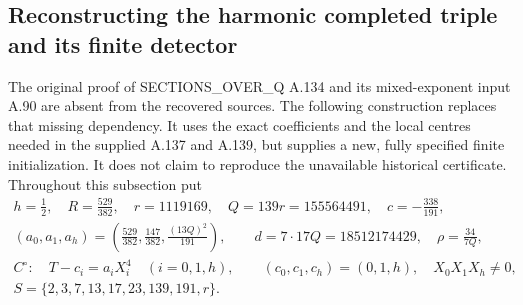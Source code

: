 \subsection{Reconstructing the harmonic completed triple and its finite detector}

The original proof of SECTIONS\_OVER\_Q A.134 and its mixed-exponent
input A.90 are absent from the recovered sources.  The following
construction replaces that missing dependency.  It uses the exact
coefficients and the local centres needed in the supplied A.137 and
A.139, but supplies a new, fully specified finite initialization.
It does not claim to reproduce the unavailable historical certificate.
Throughout this subsection put
\[
\begin{gathered}
 h=\tfrac12,\quad R=\tfrac{529}{382},\quad
 r=1119169,\quad Q=139r=155564491,\quad c=-\tfrac{338}{191},\\
 (a_0,a_1,a_h)=\left(\tfrac{529}{382},\tfrac{147}{382},
                     \tfrac{(13Q)^2}{191}\right),\qquad
 d=7\cdot17Q=18512174429,\quad \rho=\tfrac{34}{7Q},\\
 C^\circ:\quad T-c_i=a_iX_i^4\quad(i=0,1,h),\qquad
 (c_0,c_1,c_h)=(0,1,h),\quad X_0X_1X_h\ne0,\\
 S=\{2,3,7,13,17,23,139,191,r\}.
\end{gathered}
\tag{E.160.1}
\]

